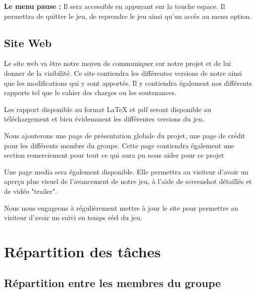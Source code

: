 \documentclass{article}
\begin{document}
\par
\textbf{Le menu pause :} Il sera accessible en appuyant sur la touche espace. Il permettra de quitter le jeu, de reprendre le jeu ainsi qu'un accès au menu option.
\newline





\newpage
\subsection{Site Web}

\par
Le site web va être notre moyen de communiquer sur notre projet et de lui donner de la visibilité. Ce site contiendra les différentes versions de notre ainsi que les modifications qui y sont apportés. Il y contiendra également nos différents rapports tel que le cahier des charges ou les soutenances.
\newline

\par
Les rapport disponible au format LaTeX et pdf seront disponible au téléchargement et bien évidemment les différentes versions du jeu.
\newline

\par
Nous ajouterons une page de présentation globale du projet, une page de crédit pour les différents membre du groupe. Cette page contiendra également une section remerciement pour tout ce qui aura pu nous aider pour ce projet
\newline

\par
Une page media sera également disponible. Elle permettra au visiteur d'avoir un aperçu plus visuel de l'avancement de notre jeu, à l'aide de screenshot détaillés et de vidéo "trailer".
\newline

\par
Nous nous engageons à régulièrement mettre à jour le site pour permettre au visiteur d'avoir un suivi en temps réel du jeu.
\newline



\newpage
\section{Répartition des tâches}
\subsection{Répartition entre les membres du groupe}
\end{document}
